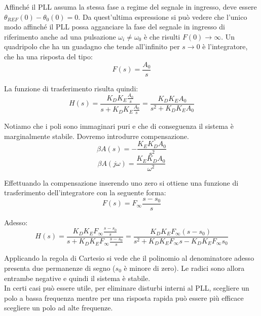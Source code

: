 Affinché il PLL assuma la stessa fase a regime del segnale in ingresso, deve essere $\theta_{REF}(0) - \theta_0(0) = 0$. Da quest'ultima espressione si può vedere che l'unico modo affinché il PLL	possa agganciare la fase del segnale in ingresso di riferimento anche ad una pulsazione $\omega_i \neq \omega_0$ è che risulti $F (0) \rightarrow\infty$. Un quadripolo che ha un guadagno che tende all'infinito per $s \rightarrow 0$ è l'integratore, che ha una risposta del tipo:
$$F(s) = \frac{A_0}{s}$$

La funzione di trasferimento risulta quindi:
\[H(s) = \frac{K_D K_E \frac{A_0}{s}}{s+ K_D K_E \frac{A_0}{s}} = \frac{K_D K_E A_0}{s^2 + K_D K_E A_0}\]

Notiamo che i poli sono immaginari puri e che di conseguenza il sistema è marginalmente stabile. Dovremo introdurre compensazione.
\[\beta A (s) = - \frac{K_E K_D A_0}{s^2}\]
\[\beta A (j\omega) = \frac{K_E K_D A_0}{\omega^2}\]




Effettuando la compensazione inserendo uno zero si ottiene una funzione di trasferimento dell'integratore con la seguente forma:
\[ F(s) = F_{\infty} \frac{s-s_0}{s}\]

Adesso:
\[H(s) = \frac{K_D K_E F_{\infty} \frac{s-s_0}{s}}{s+K_D K_E F_{\infty} \frac{s-s_0}{s}} = \frac{K_D K_E F_{\infty} (s-s_0)}{s^2 + K_D K_E F_{\infty} s - K_D K_E F_{\infty} s_0}\]

Applicando la regola di Cartesio si vede che il polinomio al denominatore adesso presenta due permanenze di segno ($s_0$ è minore di zero). Le radici sono allora entrambe negative e quindi il sistema è stabile.
\\
In certi casi può essere utile, per eliminare disturbi interni al PLL, scegliere un polo a bassa frequenza mentre per una risposta rapida può essere più efficace  scegliere un polo ad alte frequenze.
%	

